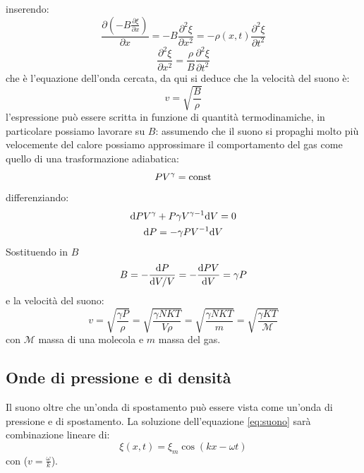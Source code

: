 inserendo:
\begin{equation}
	\frac{\partial(-B\frac{\partial\xi}{\partial x})}{\partial x}=-B\frac{\partial^2\xi}{\partial x^2}=-\rho(x,t)\frac{\partial^2\xi}{\partial t^2}
\end{equation}
\begin{equation}
	\frac{\partial^2\xi}{\partial x^2}=\frac{\rho}{B}\frac{\partial^2\xi}{\partial t^2}
	\label{eq:suono}
\end{equation}
che è l'equazione dell'onda cercata, da qui si deduce che la velocità del suono è:
\begin{equation}
	v=\sqrt{\frac{B}{\rho}}
\end{equation}
l'espressione può essere scritta in funzione di quantità termodinamiche, in particolare possiamo lavorare su $B$: assumendo che il suono si propaghi molto più velocemente del calore possiamo approssimare il comportamento del gas come quello di una trasformazione adiabatica:
\begin{equation}
	PV^\gamma=\text{const}
\end{equation}
differenziando:
\begin{gather}
	\mathrm{d} PV^\gamma+P\gamma V^{\gamma-1}\mathrm{d} V=0\\
	\mathrm{d} P=-\gamma P V^{-1}\mathrm{d} V
\end{gather}
Sostituendo in $B$
\begin{equation}
	B=-\frac{\mathrm{d} P}{\mathrm{d} V/V}=-\frac{\mathrm{d} PV}{\mathrm{d} V}=\gamma P
\end{equation}
e la velocità del suono:
\begin{equation}
	v=\sqrt{\frac{\gamma P}{\rho}}=\sqrt{\frac{\gamma NKT}{V\rho}}=\sqrt{\frac{\gamma NKT}{m}}=\sqrt{\frac{\gamma KT}{\mathcal{M}}}
\end{equation}
con $\mathcal{M}$ massa di una molecola e $m$ massa del gas.
\subsection{Onde di pressione e di densità}
Il suono oltre che un'onda di spostamento può essere vista come un'onda di pressione e di spostamento. La soluzione dell'equazione \ref{eq:suono} sarà combinazione lineare di:
\[
	\xi(x,t) = \xi_m \cos(kx-\omega t)
\]
con (\(v=\frac{\omega}{k}\)).

